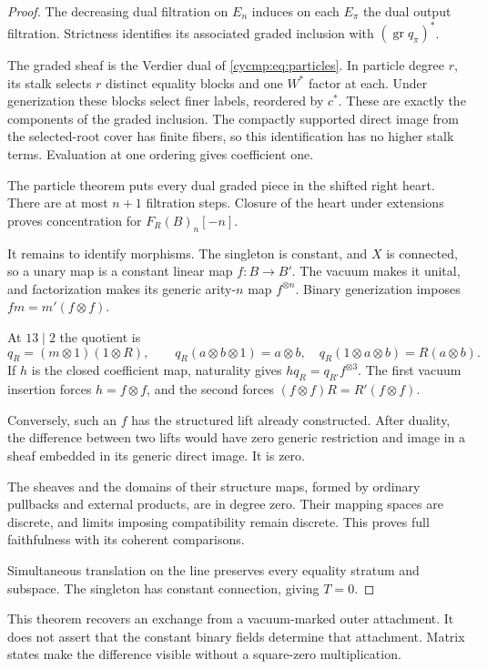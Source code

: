 \begin{proof}
The decreasing dual filtration
on $E_n$ induces on each $E_\pi$ the dual output filtration.
Strictness identifies its associated graded inclusion with
$(\operatorname{gr}q_\pi)^*$.

The graded sheaf is the Verdier dual of
\eqref{cycmp:eq:particles}. In particle degree $r$, its stalk selects
$r$ distinct equality blocks and one $W^*$ factor at each. Under
generization these blocks select finer labels, reordered by $c^*$.
These are exactly the components of the graded inclusion. The
compactly supported direct image from the selected-root cover has
finite fibers, so this identification has no higher stalk terms.
Evaluation at one ordering gives coefficient one.

The particle
theorem puts every dual graded piece in the shifted right heart.
There are at most $n+1$ filtration steps. Closure of the heart under
extensions proves concentration for $F_R(B)_n[-n]$.

It remains to identify morphisms. The singleton is constant, and
$X$ is connected, so a unary map is a constant linear map $f:B\to B'$.
The vacuum makes it unital, and factorization makes its generic
arity-$n$ map $f^{\otimes n}$. Binary generization imposes
$fm=m'(f\otimes f)$.

At $13\mid2$ the quotient is
\[
 q_R=(m\otimes1)(1\otimes R),\qquad
 q_R(a\otimes b\otimes1)=a\otimes b,
 \quad q_R(1\otimes a\otimes b)=R(a\otimes b).
\]
If $h$ is the closed coefficient map, naturality gives
$hq_R=q_{R'}f^{\otimes3}$. The first vacuum insertion forces
$h=f\otimes f$, and the second forces
$(f\otimes f)R=R'(f\otimes f)$.

Conversely, such an $f$ has the structured lift already constructed.
After duality, the difference between two lifts would have zero
generic restriction and image in a sheaf embedded in its generic
direct image. It is zero.

The sheaves and the domains of their
structure maps, formed by ordinary pullbacks and external products,
are in degree zero. Their mapping spaces are discrete, and limits
imposing compatibility remain discrete. This proves full faithfulness
with its coherent comparisons.

Simultaneous translation on the line
preserves every equality stratum and subspace. The singleton has
constant connection, giving $T=0$.
\end{proof}

This theorem recovers an exchange from a vacuum-marked outer
attachment. It does not assert that the constant binary fields
determine that attachment. Matrix states make the difference visible
without a square-zero multiplication.

